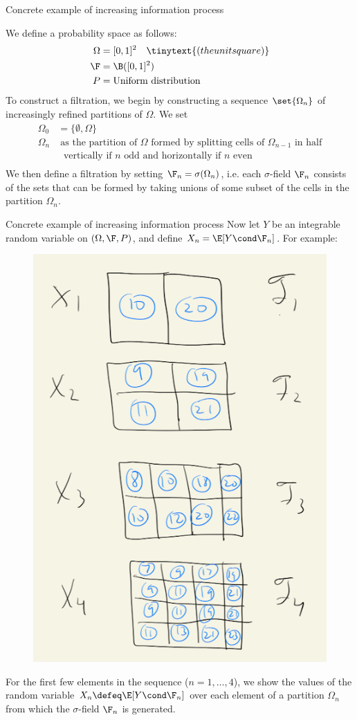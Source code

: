 \documentclass[10pt]{beamer}
\begin{document}
\begin{frame}{Concrete example of increasing information process}

We define a probability space as follows:
%
\begin{align*}
\Omega &= [0,1]^2 \quad \tinytext{(the unit square)} \\
\F &= \B([0,1]^2) \\
P &= \text{Uniform distribution}
\end{align*}
%
To construct a filtration, we begin by constructing a sequence $\set{\Omega_n}$ of increasingly refined partitions of $\Omega$. We set
%
\begin{align*}
\Omega_0 &= \bigg\{ \emptyset, \Omega \bigg\} \\
\Omega_n & \; \text{as the partition of $\Omega$ formed by splitting cells of $\Omega_{n-1}$ in half} \\
& \; \text{ vertically if $n$ odd and horizontally if $n$ even} \\
\end{align*} 	
%
We then define a filtration by setting $\F_n = \sigma(\Omega_n)$, i.e. each $\sigma$-field $\F_n$ consists of the sets that can be formed by taking unions of some subset of the cells in the partition $\Omega_n$.  
\end{frame}


\begin{frame}{Concrete example of increasing information process}
\scriptsize Now let $Y$ be an integrable random variable on $(\Omega, \F, P)$, and define $X_n = \E[Y \cond \F_n]$. For example:
%
\begin{figure}[H]
\centering
\includegraphics[width=.4\textwidth]{images/example_of_increasing_information_process.png}	
\end{figure}
For the first few elements in the sequence ($n=1,\hdots,4$), we show the values of the random variable $X_n \defeq \E[Y \cond \F_n]$ over each element of a partition $\Omega_n$ from which the $\sigma$-field $\F_n$ is generated.
\end{frame}
\end{document}
